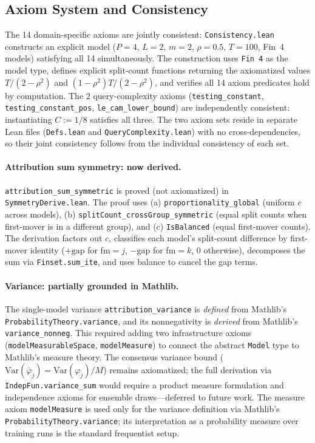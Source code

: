\documentclass{article}
\newcommand{\Var}{\mathrm{Var}}
\begin{document}
\subsection{Axiom System and Consistency}

The 14 domain-specific axioms are jointly consistent: \texttt{Consistency.lean} constructs an explicit model ($P{=}4$, $L{=}2$, $m{=}2$, $\rho{=}0.5$, $T{=}100$, Fin~4 models) satisfying all 14 simultaneously. The construction uses \texttt{Fin 4} as the model type, defines explicit split-count functions returning the axiomatized values $T/(2-\rho^2)$ and $(1-\rho^2)T/(2-\rho^2)$, and verifies all 14 axiom predicates hold by computation. The 2 query-complexity axioms (\texttt{testing\_constant}, \texttt{testing\_constant\_pos}, \texttt{le\_cam\_lower\_bound}) are independently consistent: instantiating $C := 1/8$ satisfies all three. The two axiom sets reside in separate Lean files (\texttt{Defs.lean} and \texttt{QueryComplexity.lean}) with no cross-dependencies, so their joint consistency follows from the individual consistency of each set.

\paragraph{Attribution sum symmetry: now derived.}
\texttt{attribution\_sum\_symmetric} is proved (not axiomatized) in \texttt{SymmetryDerive.lean}. The proof uses (a) \texttt{proportionality\_global} (uniform $c$ across models), (b) \texttt{splitCount\_crossGroup\_symmetric} (equal split counts when first-mover is in a different group), and (c) \texttt{IsBalanced} (equal first-mover counts). The derivation factors out $c$, classifies each model's split-count difference by first-mover identity ($+\text{gap}$ for fm$=j$, $-\text{gap}$ for fm$=k$, $0$ otherwise), decomposes the sum via \texttt{Finset.sum\_ite}, and uses balance to cancel the gap terms.

\paragraph{Variance: partially grounded in Mathlib.}
\begin{sloppypar}
The single-model variance \texttt{attribution\allowbreak\_variance} is \emph{defined}
from Mathlib's \texttt{ProbabilityTheory.variance}, and its nonnegativity is
\emph{derived} from Mathlib's \texttt{variance\allowbreak\_nonneg}. This required
adding two infrastructure axioms (\texttt{modelMeasurableSpace},
\texttt{modelMeasure}) to connect the abstract \texttt{Model} type to Mathlib's
measure theory. The consensus variance bound ($\Var(\bar\varphi_j) = \Var(\varphi_j)/M$)
remains axiomatized; the full derivation via \texttt{IndepFun.variance\_sum} would
require a product measure formulation and independence axioms for ensemble
draws---deferred to future work.
The measure axiom \texttt{modelMeasure} is used only for the variance definition via Mathlib's \texttt{ProbabilityTheory.variance}; its interpretation as a probability measure over training runs is the standard frequentist setup.
\end{sloppypar}
\end{document}
